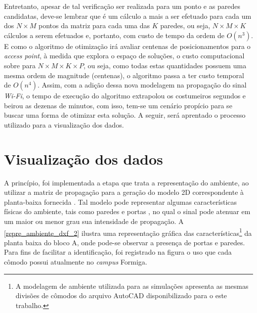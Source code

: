 \documentclass[
	12pt,				%
	twoside,			%
	a4paper,			%
	english,			%
	french,				%
	spanish,			%
	brazil				%
	]{abntex2}
\begin{document}
Entretanto, apesar de tal verificação ser realizada para um ponto e as
paredes candidatas, deve-se lembrar que é um cálculo a mais a ser
efetuado para cada um dos \(N \times M\) pontos da matriz para cada uma
das \(K\) paredes, ou seja, \(N \times M \times K\) cálculos a serem
efetuados e, portanto, com custo de tempo da ordem de \(O(n^{3})\). E
como o algoritmo de otimização irá avaliar centenas de posicionamentos
para o \emph{access point}, à medida que explora o espaço de soluções, o
custo computacional sobre para \(N \times M \times K \times P\), ou
seja, como todas estas quantidades possuem uma mesma ordem de magnitude
(centenas), o algoritmo passa a ter custo temporal de \(O(n^{4})\).
Assim, com a adição dessa nova modelagem na propagação do sinal
\emph{Wi-Fi}, o tempo de execução do algoritmo extrapolou os costumeiros
segundos e beirou as dezenas de minutos, com isso, tem-se um cenário
propício para se buscar uma forma de otimizar esta solução. A seguir,
será aprentado o processo utilizado para a visualização dos dados.

\section{Visualização dos dados}\label{visualizauxe7uxe3o-dos-dados}

A princípio, foi implementada a etapa que trata a representação do
ambiente, ao utilizar a matriz de propagação para a geração do modelo 2D
correspondente à planta-baixa fornecida \cite{KASE,THAKUR}. Tal modelo
pode representar algumas características físicas do ambiente, tais como
paredes e portas \cite{MARSCHALLINGER}, no qual o sinal pode atenuar em
um maior ou menor grau sua intensidade de propagação. A
\autoref{repre_ambiente_dxf_2} ilustra uma representação gráfica das
características\footnote{A modelagem de ambiente utilizada para as
  simulações apresenta as mesmas divisões de cômodos do arquivo AutoCAD
  disponibilizado para o este trabalho.} da planta baixa do bloco A,
onde pode-se observar a presença de portas e paredes. Para fins de
facilitar a identificação, foi registrado na figura o uso que cada
cômodo possui atualmente no \emph{campus} Formiga.
\end{document}
